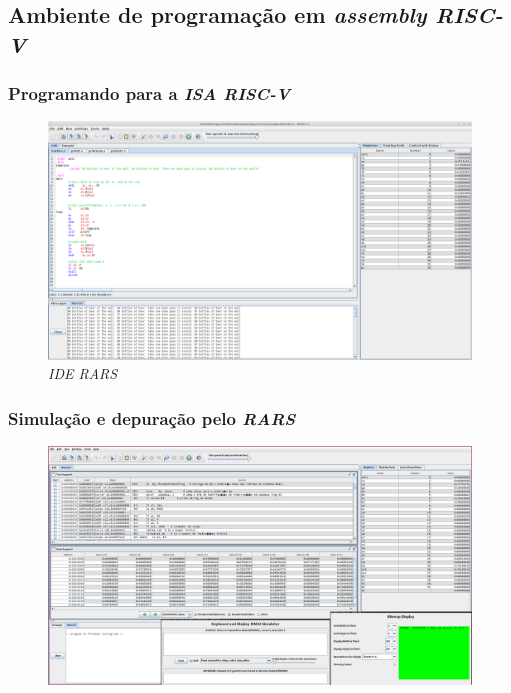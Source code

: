 \documentclass[aspectratio=169]{beamer}
\begin{document}
    \subsection{Ambiente de programação em \textit{assembly RISC-V}}
    \begin{frame}
        \frametitle{Programando para a \textit{ISA RISC-V}}
        \vfill
        \begin{figure}[H]
        \centering
            \includegraphics[width=.9\textwidth,height=.85\textheight,keepaspectratio]
            {../images/rars.png}
            \caption{\textit{IDE RARS}}
        \end{figure}
        \vfill
    \end{frame}

    \begin{frame}
        \frametitle{Simulação e depuração pelo \textit{RARS}}
        \vfill
        \begin{figure}[H]
        \centering
            \includegraphics[width=.9\textwidth,height=.85\textheight,keepaspectratio]
            {../images/rars_debug.png}
        \end{figure}
        \vfill
    \end{frame}
\end{document}

